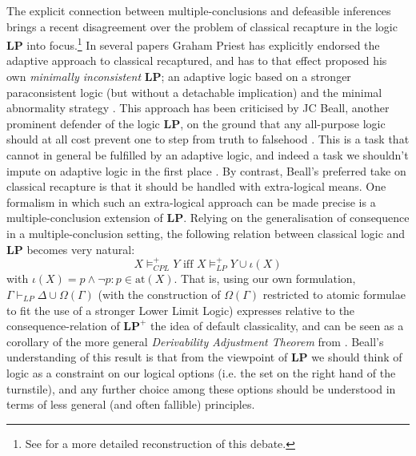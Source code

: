 \documentclass[]{article}
\begin{document}
The explicit connection between multiple-conclusions and defeasible inferences brings a recent disagreement over the problem of classical recapture in the logic \textbf{LP} into focus.\footnote{See \cite[18ff]{Allo:Theoria:2015} for a more detailed reconstruction of this debate.} In several papers Graham Priest has explicitly endorsed the adaptive approach to classical recaptured, and has to that effect proposed his own \emph{minimally inconsistent} \textbf{LP}; an adaptive logic based on a stronger paraconsistent logic (but without a detachable implication) and the minimal abnormality strategy \cite{GP:LPm}. This approach has been criticised by JC Beall, another prominent defender of the logic \textbf{LP}, on the ground that any all-purpose logic should at all cost prevent one to step from truth to falsehood \cite{Beall01072012}. This is a task that cannot in general be fulfilled by an adaptive logic, and indeed a task we shouldn't impute on adaptive logic in the first place \cite{Priest01102012}. By contrast, Beall's preferred take on classical recapture is that it should be handled with extra-logical means. One formalism in which such an extra-logical approach can be made precise is a multiple-conclusion extension of \textbf{LP}. Relying on the generalisation of consequence in a multiple-conclusion setting, the following relation between classical logic and \textbf{LP} \cite[Theorem 3.7]{Beall:TheReviewOfSymbolicLogic:2011} becomes very natural:
\[
    X \models_{CPL}^+ Y \text{ iff } X \models_{LP}^+ Y \cup \iota(X)
\]
with $\iota(X) ={p \wedge \neg p : p \in \mathrm{at}(X)}$. That is, using our own formulation, $\Gamma \vdash_{LP} \Delta \cup \Omega(\Gamma)$ (with the construction of $\Omega(\Gamma)$ restricted to atomic formulae to fit the use of a stronger Lower Limit Logic) expresses relative to the consequence-relation of $\mathbf{LP}^+$ the idea of default classicality, and can be seen as a corollary of the more general \emph{Derivability Adjustment Theorem} from \cite{batens07}. Beall's understanding of this result is that from the viewpoint of \textbf{LP} we should think of logic as a constraint on our logical options (i.e. the set on the right hand of the turnstile), and any further choice among these options should be understood in terms of less general (and often fallible) principles. 
\end{document}
